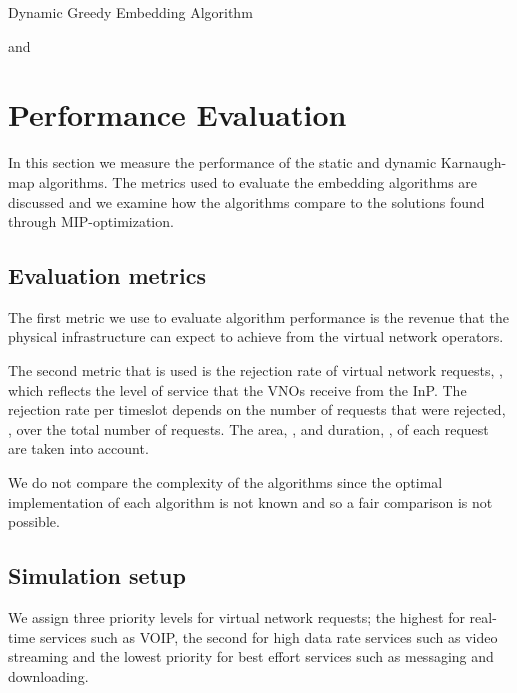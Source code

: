 \documentclass[conference]{IEEEtran}
\begin{document}
\begin{algorithm}
\caption{Dynamic Greedy Embedding Algorithm}
\label{Algorithm:1}
\begin{algorithmic}[1]
 \REQUIRE  and 
 \FORALL{}
 \STATE{}
 \STATE{}
 \ENDIF
 \ENDFOR
 \ENDWHILE
  \ENDFOR

\end{algorithmic}
\end{algorithm}



\section{Performance Evaluation}
\label{sect:evaluation}
In this section we measure the performance of the static and dynamic Karnaugh-map algorithms. The metrics used to evaluate the embedding algorithms are discussed and we examine how the algorithms compare to the solutions found through MIP-optimization.

\subsection{Evaluation metrics }

The first metric we use to evaluate algorithm performance is the revenue that the physical infrastructure can expect to achieve from the virtual network operators.

The second metric that is used is the rejection rate of virtual network requests, , which reflects the level of service that the VNOs receive from the InP. The rejection rate per timeslot depends on the number of requests that were rejected, , over the total number of requests. The area, , and duration, , of each request are taken into account.




We do not compare the complexity of the algorithms since the optimal implementation of each algorithm is not known and so a fair comparison is not possible.

\subsection{Simulation setup}
We assign three priority levels for virtual network requests; the highest for real-time services such as VOIP, the second for high data rate services such as video streaming and the lowest priority for best effort services such as messaging and downloading.
\end{document}
